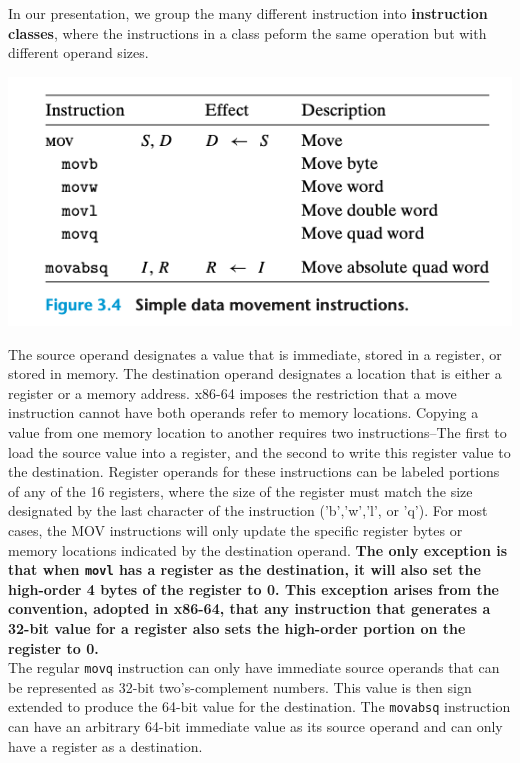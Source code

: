 \documentclass[11pt]{article}
\begin{document}
In our presentation, we group the many different instruction into \textbf{instruction classes}, where the instructions in a class peform the same operation but with different operand sizes.\\

\begin{center}
\includegraphics[width=.9\linewidth]{pics/simple-data-movement-instructions.png}
\end{center}

The source operand designates a value that is immediate, stored in a register, or stored in memory. The destination operand designates a location that is either a register or a memory address. x86-64 imposes the restriction that a move instruction cannot have both operands refer to memory locations. Copying a value from one memory location to another requires two instructions--The first to load the source value into a register, and the second to write this register value to the destination. Register operands for these instructions can be labeled portions of any of the 16 registers, where the size of the register must match the size designated by the last character of the instruction ('b','w','l', or 'q'). For most cases, the MOV instructions will only update the specific register bytes or memory locations indicated by the destination operand. \textbf{The only exception is that when \texttt{movl} has a register as the destination, it will also set the high-order 4 bytes of the register to 0. This exception arises from the convention, adopted in x86-64, that any instruction that generates a 32-bit value for a register also sets the high-order portion on the register to 0.}\\

The regular \texttt{movq} instruction can only have immediate source operands that can be represented as 32-bit two’s-complement numbers. This value is then sign extended to produce the 64-bit value for the destination. The \texttt{movabsq} instruction can have an arbitrary 64-bit immediate value as its source operand and can only have a register as a destination.\\
\end{document}
